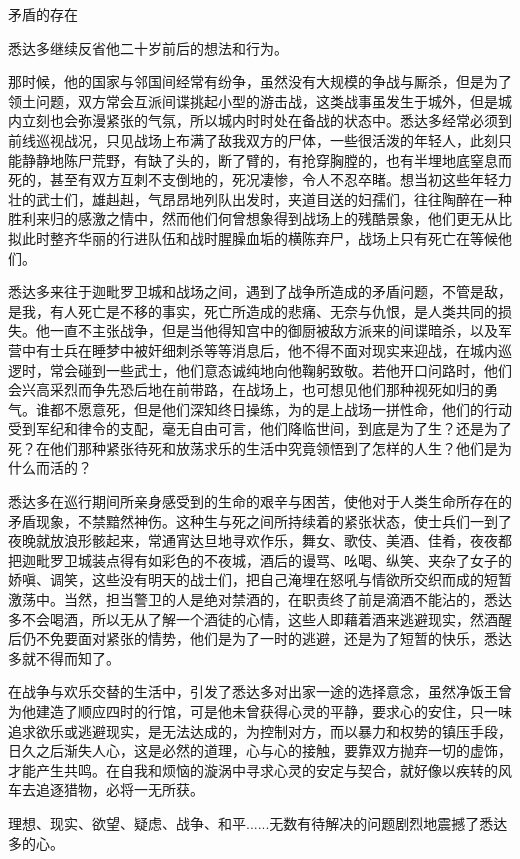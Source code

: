 \documentclass[12pt,twoside,openany]{book}
\begin{document}
矛盾的存在

悉达多继续反省他二十岁前后的想法和行为。

那时候，他的国家与邻国间经常有纷争，虽然没有大规模的争战与厮杀，但是为了领土问题，双方常会互派间谍挑起小型的游击战，这类战事虽发生于城外，但是城内立刻也会弥漫紧张的气氛，所以城内时时处在备战的状态中。悉达多经常必须到前线巡视战况，只见战场上布满了敌我双方的尸体，一些很活泼的年轻人，此刻只能静静地陈尸荒野，有缺了头的，断了臂的，有抢穿胸膛的，也有半埋地底窒息而死的，甚至有双方互刺不支倒地的，死况凄惨，令人不忍卒睹。想当初这些年轻力壮的武士们，雄赳赳，气昂昂地列队出发时，夹道目送的妇孺们，往往陶醉在一种胜利来归的感激之情中，然而他们何曾想象得到战场上的残酷景象，他们更无从比拟此时整齐华丽的行进队伍和战时腥臊血垢的横陈弃尸，战场上只有死亡在等候他们。

悉达多来往于迦毗罗卫城和战场之间，遇到了战争所造成的矛盾问题，不管是敌，是我，有人死亡是不移的事实，死亡所造成的悲痛、无奈与仇恨，是人类共同的损失。他一直不主张战争，但是当他得知宫中的御厨被敌方派来的间谍暗杀，以及军营中有士兵在睡梦中被奸细刺杀等等消息后，他不得不面对现实来迎战，在城内巡逻时，常会碰到一些武士，他们意态诚纯地向他鞠躬致敬。若他开口问路时，他们会兴高采烈而争先恐后地在前带路，在战场上，也可想见他们那种视死如归的勇气。谁都不愿意死，但是他们深知终日操练，为的是上战场一拼性命，他们的行动受到军纪和律令的支配，毫无自由可言，他们降临世间，到底是为了生？还是为了死？在他们那种紧张待死和放荡求乐的生活中究竟领悟到了怎样的人生？他们是为什么而活的？

悉达多在巡行期间所亲身感受到的生命的艰辛与困苦，使他对于人类生命所存在的矛盾现象，不禁黯然神伤。这种生与死之间所持续着的紧张状态，使士兵们一到了夜晚就放浪形骸起来，常通宵达旦地寻欢作乐，舞女、歌伎、美酒、佳肴，夜夜都把迦毗罗卫城装点得有如彩色的不夜城，酒后的谩骂、吆喝、纵笑、夹杂了女子的娇嗔、调笑，这些没有明天的战士们，把自己淹埋在怒吼与情欲所交织而成的短暂激荡中。当然，担当警卫的人是绝对禁酒的，在职责终了前是滴酒不能沾的，悉达多不会喝酒，所以无从了解一个酒徒的心情，这些人即藉着酒来逃避现实，然酒醒后仍不免要面对紧张的情势，他们是为了一时的逃避，还是为了短暂的快乐，悉达多就不得而知了。

在战争与欢乐交替的生活中，引发了悉达多对出家一途的选择意念，虽然净饭王曾为他建造了顺应四时的行馆，可是他未曾获得心灵的平静，要求心的安住，只一味追求欲乐或逃避现实，是无法达成的，为控制对方，而以暴力和权势的镇压手段，日久之后渐失人心，这是必然的道理，心与心的接触，要靠双方抛弃一切的虚饰，才能产生共鸣。在自我和烦恼的漩涡中寻求心灵的安定与契合，就好像以疾转的风车去追逐猎物，必将一无所获。

理想、现实、欲望、疑虑、战争、和平......无数有待解决的问题剧烈地震撼了悉达多的心。
\end{document}
